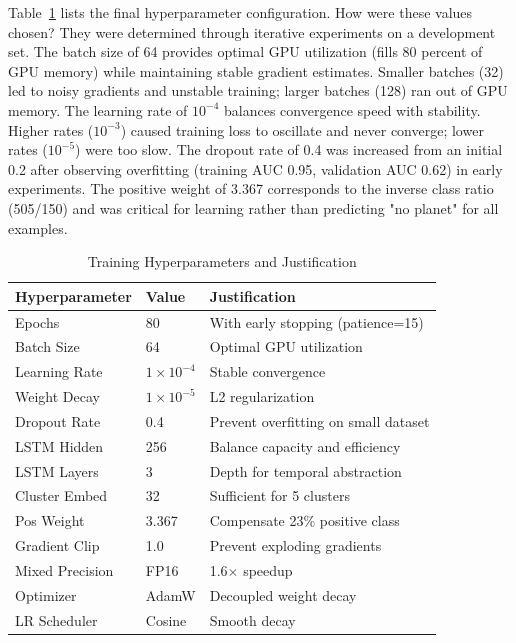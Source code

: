\documentclass[letterpaper]{article} %
\begin{document}
Table~\ref{tab:bilstm_hyperparams} lists the final hyperparameter configuration. How were these values chosen? They were determined through iterative experiments on a development set. The batch size of 64 provides optimal GPU utilization (fills 80 percent of GPU memory) while maintaining stable gradient estimates. Smaller batches (32) led to noisy gradients and unstable training; larger batches (128) ran out of GPU memory. The learning rate of $10^{-4}$ balances convergence speed with stability. Higher rates ($10^{-3}$) caused training loss to oscillate and never converge; lower rates ($10^{-5}$) were too slow. The dropout rate of 0.4 was increased from an initial 0.2 after observing overfitting (training AUC 0.95, validation AUC 0.62) in early experiments. The positive weight of 3.367 corresponds to the inverse class ratio (505/150) and was critical for learning rather than predicting "no planet" for all examples.

\begin{table}[h]
\centering
\caption{Training Hyperparameters and Justification}
\label{tab:bilstm_hyperparams}
\begin{tabular}{@{}llp{5.5cm}@{}}
\toprule
\textbf{Hyperparameter} & \textbf{Value} & \textbf{Justification} \\
\midrule
Epochs & 80 & With early stopping (patience=15) \\
Batch Size & 64 & Optimal GPU utilization \\
Learning Rate & $1 \times 10^{-4}$ & Stable convergence \\
Weight Decay & $1 \times 10^{-5}$ & L2 regularization \\
Dropout Rate & 0.4 & Prevent overfitting on small dataset \\
LSTM Hidden & 256 & Balance capacity and efficiency \\
LSTM Layers & 3 & Depth for temporal abstraction \\
Cluster Embed & 32 & Sufficient for 5 clusters \\
Pos Weight & 3.367 & Compensate 23\% positive class \\
Gradient Clip & 1.0 & Prevent exploding gradients \\
Mixed Precision & FP16 & 1.6$\times$ speedup \\
Optimizer & AdamW & Decoupled weight decay \\
LR Scheduler & Cosine & Smooth decay \\
\bottomrule
\end{tabular}
\end{table}
\end{document}
